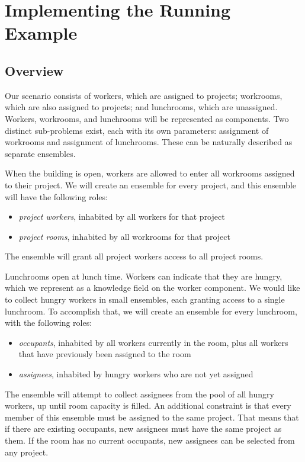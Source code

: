 \section{Implementing the Running Example}
\label{dsl:example}


\subsection{Overview}

Our scenario consists of workers, which are assigned to projects; workrooms, which are
also assigned to projects; and lunchrooms, which are unassigned. Workers, workrooms, and
lunchrooms will be represented as components. Two distinct sub-problems exist, each with
its own parameters: assignment of workrooms and assignment of lunchrooms. These can be
naturally described as separate ensembles.

\medskip

When the building is open, workers are allowed to enter all workrooms assigned to their
project. We will create an ensemble for every project, and this ensemble will have the
following roles:
\begin{itemize}
    \renewcommand\labelitemi{--}
    \setlength\itemsep{0em}
    \item \textit{project workers}, inhabited by all workers for that project
    \item \textit{project rooms}, inhabited by all workrooms for that project
\end{itemize}
The ensemble will grant all project workers access to all project rooms.

\medskip

Lunchrooms open at lunch time. Workers can indicate that they are hungry, which we
represent as a knowledge field on the worker component. We would like to collect hungry
workers in small ensembles, each granting access to a single lunchroom. To accomplish
that, we will create an ensemble for every lunchroom, with the following roles:

\begin{itemize}
    \renewcommand\labelitemi{--}
    \setlength\itemsep{0em}
    \item \textit{occupants}, inhabited by all workers currently in the room, plus all
    workers that have previously been assigned to the room
    \item \textit{assignees}, inhabited by hungry workers who are not yet assigned
\end{itemize}
The ensemble will attempt to collect assignees from the pool of all hungry workers, up
until room capacity is filled. An additional constraint is that every member of this
ensemble must be assigned to the same project. That means that if there are existing
occupants, new assignees must have the same project as them. If the room has no current
occupants, new assignees can be selected from any project.

